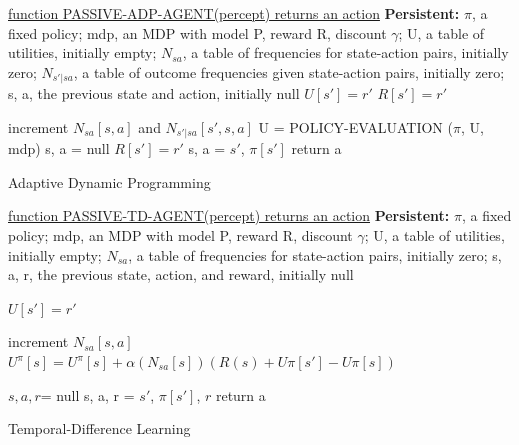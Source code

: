 \documentclass[12pt]{article}
\begin{document}
\begin{algorithm}

    \underline{function PASSIVE-ADP-AGENT(percept) returns an action} \;
    \textbf{Persistent:} 
    {$\pi$}, a fixed policy; 
    mdp, an MDP with model P, reward R, discount $\gamma$; 
    U, a table of utilities, initially empty; 
    $N_{sa}$, a table of frequencies for state-action pairs, initially zero; 
    $N_{s'|sa}$, a table of outcome frequencies given state-action pairs, initially zero; 
    s, a, the previous state and action, initially null \;
      {
        $U[s'] = r'$ \;
        $R[s'] = r'$\;
      }
      
      {
        increment $N_{sa}[s, a]$ and $N_{s'|sa}[s', s, a]$ \;        	
      }
      U = POLICY-EVALUATION ($\pi$, U, mdp)\;
      {
        s, a = null \;
        $R[s'] = r'$\;
      }
      {
      s, a = $s'$, $\pi[s']$
      }
      return a
    \caption{Adaptive Dynamic Programming}
\end{algorithm}

\begin{algorithm}

    \underline{function PASSIVE-TD-AGENT(percept) returns an action} \;
    \textbf{Persistent:} 
    {$\pi$}, a fixed policy; 
    mdp, an MDP with model P, reward R, discount $\gamma$; 
    U, a table of utilities, initially empty; 
    $N_{sa}$, a table of frequencies for state-action pairs, initially zero; 
    s, a, r, the previous state, action, and reward, initially null \;
    
      {
        $U[s'] = r'$ \;
      }
      
      {
        increment $N_{sa}[s, a]$ \;        	
	$U^\pi[s] = U^\pi[s] + \alpha( N_{sa}[s])(R(s) + U\pi[s'] - U\pi[s])$
      }
    
      {
        $s, a, r$= null \;
      }
      {
      s, a, r = $s'$, $\pi[s']$, $r$
      }
      return a
    \caption{Temporal-Difference Learning}
\end{algorithm}
\end{document}
